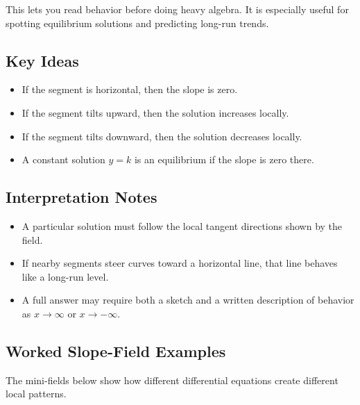 \documentclass[12pt]{article}
\begin{document}
This lets you read behavior before doing heavy algebra. It is especially useful for spotting equilibrium solutions and predicting long-run trends.

\subsection{Key Ideas}
\begin{itemize}[leftmargin=*]
  \item If the segment is horizontal, then the slope is zero.
  \item If the segment tilts upward, then the solution increases locally.
  \item If the segment tilts downward, then the solution decreases locally.
  \item A constant solution $y=k$ is an equilibrium if the slope is zero there.
\end{itemize}

\subsection{Interpretation Notes}
\begin{itemize}[leftmargin=*]
  \item A particular solution must follow the local tangent directions shown by the field.
  \item If nearby segments steer curves toward a horizontal line, that line behaves like a long-run level.
  \item A full answer may require both a sketch and a written description of behavior as $x \to \infty$ or $x \to -\infty$.
\end{itemize}

\subsection{Worked Slope-Field Examples}
The mini-fields below show how different differential equations create different local patterns.
\end{document}
